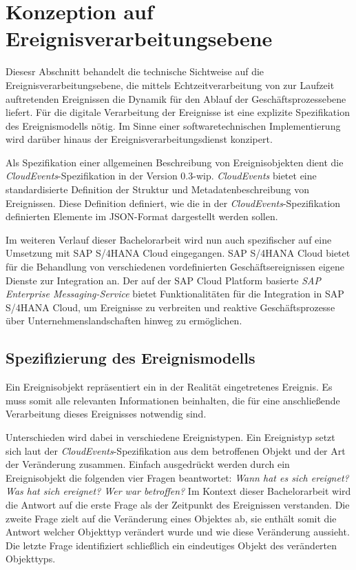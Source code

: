 \section{Konzeption auf  Ereignisverarbeitungsebene}\label{sec:ereignismodell}
Diesesr Abschnitt behandelt die technische Sichtweise auf die Ereignisverarbeitungsebene, die mittels Echtzeitverarbeitung von zur Laufzeit auftretenden Ereignissen die Dynamik für den Ablauf der Geschäftsprozessebene liefert. Für die digitale Verarbeitung der Ereignisse ist eine explizite Spezifikation des Ereignismodells nötig. Im Sinne einer softwaretechnischen Implementierung wird darüber hinaus der Ereignisverarbeitungsdienst konzipert.

Als Spezifikation einer allgemeinen Beschreibung von Ereignisobjekten dient die \textit{CloudEvents}-Spezifikation in der Version 0.3-wip. 
\textit{CloudEvents} bietet eine standardisierte Definition der Struktur und Metadatenbeschreibung von Ereignissen. Diese Definition definiert, wie die in der \textit{CloudEvents}-Spezifikation definierten Elemente im \ac{JSON}-Format dargestellt werden sollen. \cite{CloudEvents.2019}

Im weiteren Verlauf dieser Bachelorarbeit wird nun auch spezifischer auf eine Umsetzung mit SAP S/4HANA Cloud eingegangen. SAP S/4HANA Cloud bietet für die Behandlung von verschiedenen vordefinierten Geschäftsereignissen eigene Dienste zur Integration an. Der auf der SAP Cloud Platform basierte \textit{SAP Enterprise Messaging-Service} bietet Funktionalitäten für die Integration in SAP S/4HANA Cloud, um Ereignisse zu verbreiten und reaktive Geschäftsprozesse über Unternehmenslandschaften hinweg zu ermöglichen.
\cite{Schneider.2018}

\subsection{Spezifizierung des Ereignismodells}
Ein Ereignisobjekt repräsentiert ein in der Realität eingetretenes Ereignis. Es muss somit alle relevanten Informationen beinhalten, die für eine anschließende Verarbeitung dieses Ereignisses notwendig sind.

Unterschieden wird dabei in verschiedene Ereignistypen. Ein Ereignistyp setzt sich laut der \textit{CloudEvents}-Spezifikation aus dem betroffenen Objekt und der Art der Veränderung zusammen. Einfach ausgedrückt werden durch ein Ereignisobjekt die folgenden vier Fragen beantwortet: \textit{Wann hat es sich ereignet? Was hat sich ereignet? Wer war betroffen?}
Im Kontext dieser Bachelorarbeit wird die Antwort auf die erste Frage als der Zeitpunkt des Ereignissen verstanden. Die zweite Frage zielt auf die Veränderung eines Objektes ab, sie enthält somit die Antwort welcher Objekttyp verändert wurde und wie diese Veränderung aussieht. Die letzte Frage identifiziert schließlich ein eindeutiges Objekt des veränderten Objekttyps. \cite{CloudEvents.2019}

